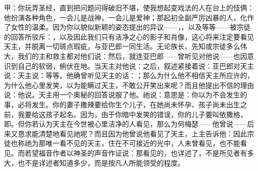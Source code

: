 甲：你玩弄圣经，直到把问题问得破旧不堪，使我想起变戏法的人在台上的伎俩：他扮演各种角色，一会儿是战神，一会儿是爱神；那起初全副严厉凶暴的人，化作了女性的温柔。因为你以貌似新颖的姿态提出的异议——，，以及等等——被宗徒的回答所驳斥：，以及因此我们只有洁净之心的影子和肖像，这心将来注定要看见天主，并脱离一切斑点瑕疵，与亚巴郎一同生活。无论族长、先知或宗徒多么伟大，我们的主和救主都对他们说：然后，就连亚巴郎——曾听见对他说——也因意识到自己的软弱，俯伏在地。当天主对他说：之后，叙述紧接着说：亚巴郎对天主说：天主说：等等。他确曾听见天主的话：；那么为什么他不相信天主所应许的，为什么他心里发笑，以为能瞒过天主，不敢公开笑出来呢？而且他提出不信的理由说：他说。天主用一个奥秘的回答说服了他。祂说：意思是：你以为不会发生的事，必将发生。你的妻子撒辣要给你生个儿子，在她尚未怀孕、孩子尚未出生之前，我要给这孩子起名。因为，由于你暗中发笑的错误，你的儿子要叫依撒格，即。但你若认为天主在今世被心里洁净的人看见，那么为何梅瑟——他曾说——后来又恳求能清楚地看见祂呢？而且因为他曾说他看见了天主，上主告诉他：因此宗徒也称祂为那唯一看不见的天主，住在不可接近的光中，人未曾看见，也不能看见。而若望福音作者以神圣的声音作证说：那看见的，也详述了，不是所见者有多大，也不是详述者知道多少，而是按凡人所能领受的程度。\par


